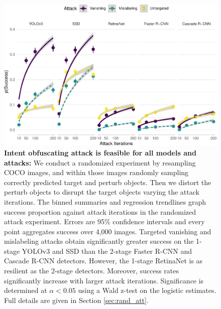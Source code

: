 \begin{figure}[tb]

{\centering \includegraphics[width=1\linewidth]{imgs/success_trend_graph} 

}

\caption{\textbf{Intent obfuscating attack is feasible for all models and attacks:}  We conduct a randomized experiment by resampling COCO images, and within those images randomly sampling correctly predicted target and perturb objects. Then we distort the perturb objects to disrupt the target objects varying the attack iterations. The binned summaries and regression trendlines graph success proportion against attack iterations in the randomized attack experiment. Errors are 95\% confidence intervals and every point aggregates success over 4,000 images. Targeted vanishing and mislabeling attacks obtain significantly greater success on the 1-stage YOLOv3 and SSD than the 2-stage Faster R-CNN and Cascade R-CNN detectors. However, the 1-stage RetinaNet is as resilient as the 2-stage detectors. Moreover, success rates significantly increase with larger attack iterations. Significance is determined at $\alpha < 0.05$ using a Wald z-test on the logistic estimates. Full details are given in Section \ref{sec:rand_att}.}\label{fig:success_trend_graph}
\end{figure}